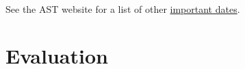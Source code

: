 \documentclass[titlepage]{article}
\newcommand\policy{../policy}
\begin{document}



See the AST website for a list of other \href{http://www.astheology.ns.ca/students/academic-dates.html}{important dates}.

\section{Evaluation}
\label{evaluation}



%
%
%
%
%
%
\end{document}
